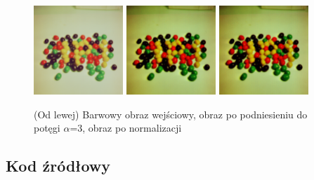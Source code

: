 \documentclass[final,a4paper,openany,12pt]{mwbk}
\begin{document}
\begin{figure}[H]
	\begin{center}
		\includegraphics[width=0.3\textwidth]{2/2Color_Pow_Original}
		\includegraphics[width=0.3\textwidth]{2/2Color_Pow_Result}
		\includegraphics[width=0.3\textwidth]{2/2Color_Pow_Result_Norm}
	\end{center}
	\caption{(Od lewej) Barwowy obraz wejściowy, obraz po podniesieniu do potęgi $\alpha$=3, obraz po normalizacji }
\end{figure}

\subsection*{Kod źródłowy}
\end{document}
